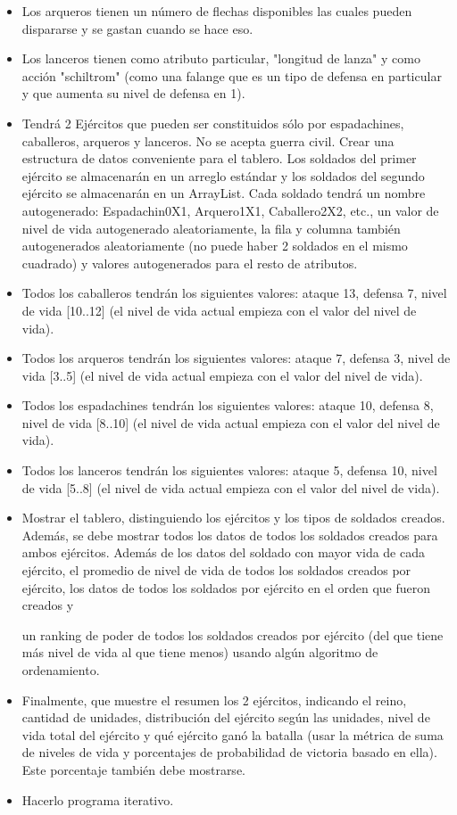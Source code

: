 \documentclass{article}
\begin{document}
\begin{itemize}
			\item Los arqueros tienen un número de flechas disponibles las cuales pueden dispararse y se gastan cuando se hace eso.
			\item Los lanceros tienen como atributo particular, "longitud de lanza" y como acción "schiltrom" (como una falange que es un tipo de defensa en particular y que aumenta su nivel de defensa en 1).
			\item Tendrá 2 Ejércitos que pueden ser constituidos sólo por espadachines, caballeros, arqueros y lanceros. No se acepta guerra civil. Crear una estructura de datos conveniente para el tablero. Los soldados del primer ejército se almacenarán en un arreglo estándar y los soldados del segundo ejército se almacenarán en un ArrayList. Cada soldado tendrá un nombre autogenerado: Espadachin0X1, Arquero1X1, Caballero2X2, etc., un valor de nivel de vida autogenerado aleatoriamente, la fila y columna también autogenerados aleatoriamente (no puede haber 2 soldados en el mismo cuadrado) y valores autogenerados para el resto de atributos.
			\item Todos los caballeros tendrán los siguientes valores: ataque 13, defensa 7, nivel
de vida [10..12] (el nivel de vida actual empieza con el valor del nivel de vida).
			\item Todos los arqueros tendrán los siguientes valores: ataque 7, defensa 3, nivel
de vida [3..5] (el nivel de vida actual empieza con el valor del nivel de vida).
			\item Todos los espadachines tendrán los siguientes valores: ataque 10, defensa 8,
nivel de vida [8..10] (el nivel de vida actual empieza con el valor del nivel de
vida).
			\item Todos los lanceros tendrán los siguientes valores: ataque 5, defensa 10, nivel
de vida [5..8] (el nivel de vida actual empieza con el valor del nivel de vida).
			\item Mostrar el tablero, distinguiendo los ejércitos y los tipos de soldados creados.
Además, se debe mostrar todos los datos de todos los soldados creados para
ambos ejércitos. Además de los datos del soldado con mayor vida de cada
ejército, el promedio de nivel de vida de todos los soldados creados por ejército,
los datos de todos los soldados por ejército en el orden que fueron creados y

un ranking de poder de todos los soldados creados por ejército (del que tiene
más nivel de vida al que tiene menos) usando algún algoritmo de ordenamiento.
			\item Finalmente, que muestre el resumen los 2 ejércitos, indicando el reino, cantidad
de unidades, distribución del ejército según las unidades, nivel de vida total del
ejército y qué ejército ganó la batalla (usar la métrica de suma de niveles de
vida y porcentajes de probabilidad de victoria basado en ella). Este porcentaje
también debe mostrarse.
			\item Hacerlo programa iterativo.
	\end{itemize}
		
\end{document}
